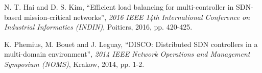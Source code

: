 \documentclass[12pt, a4paper]{article}
\begin{document}




\begin{thebibliography}{99}
  \footnotesize

  N. T. Hai and D. S. Kim,
  ``Efficient load balancing for multi-controller in SDN-based mission-critical networks'',
  \textit{2016 IEEE 14th International Conference on Industrial Informatics (INDIN)},
  Poitiers,
  2016,
  pp. 420-425.

  K. Phemius, M. Bouet and J. Leguay,
  ``DISCO: Distributed SDN controllers in a multi-domain environment'',
  \textit{2014 IEEE Network Operations and Management Symposium (NOMS)},
  Krakow,
  2014,
  pp. 1-2.
\end{thebibliography}
\end{document}
